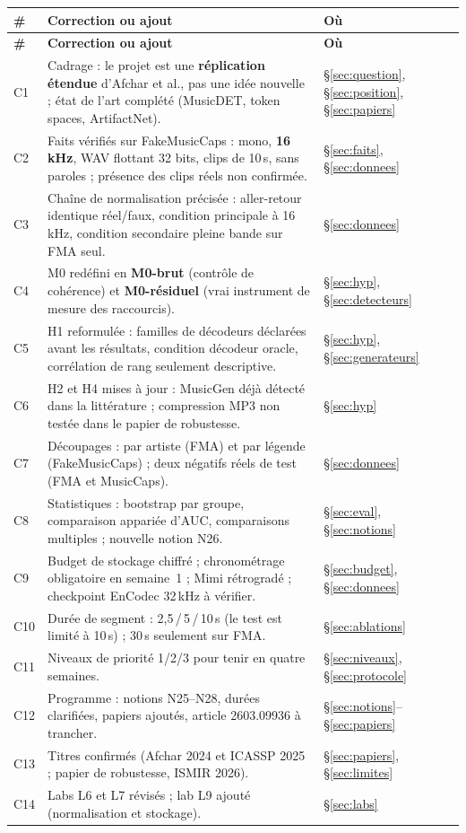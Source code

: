 \documentclass[11pt,a4paper]{article}
\providecommand{\og}{\guillemotleft\nobreakspace}%
\providecommand{\fg}{\nobreakspace\guillemotright}}
\begin{document}
{\small
\begin{longtable}{L{0.9cm}L{11.6cm}L{3.0cm}}
\toprule
\textbf{\#} & \textbf{Correction ou ajout} & \textbf{Où}\\
\midrule
\endfirsthead
\toprule
\textbf{\#} & \textbf{Correction ou ajout} & \textbf{Où}\\
\midrule
\endhead
\bottomrule
\endfoot
C1 & Cadrage : le projet est une \textbf{réplication étendue} d'Afchar et al., pas une idée nouvelle ; état de l'art complété (MusicDET, token spaces, ArtifactNet). & §\ref{sec:question}, §\ref{sec:position}, §\ref{sec:papiers}\\
C2 & Faits vérifiés sur FakeMusicCaps : mono, \textbf{16\,kHz}, WAV flottant 32 bits, clips de 10\,s, sans paroles ; présence des clips réels non confirmée. & §\ref{sec:faits}, §\ref{sec:donnees}\\
C3 & Chaîne de normalisation précisée : aller-retour identique réel/faux, condition principale à 16\,kHz, condition secondaire pleine bande sur FMA seul. & §\ref{sec:donnees}\\
C4 & M0 redéfini en \textbf{M0-brut} (contrôle de cohérence) et \textbf{M0-résiduel} (vrai instrument de mesure des raccourcis). & §\ref{sec:hyp}, §\ref{sec:detecteurs}\\
C5 & H1 reformulée : familles de décodeurs déclarées avant les résultats, condition \og{}décodeur oracle\fg{}, corrélation de rang seulement descriptive. & §\ref{sec:hyp}, §\ref{sec:generateurs}\\
C6 & H2 et H4 mises à jour : MusicGen déjà détecté dans la littérature ; compression MP3 non testée dans le papier de robustesse. & §\ref{sec:hyp}\\
C7 & Découpages : par artiste (FMA) et par légende (FakeMusicCaps) ; deux négatifs réels de test (FMA et MusicCaps). & §\ref{sec:donnees}\\
C8 & Statistiques : bootstrap par groupe, comparaison appariée d'AUC, comparaisons multiples ; nouvelle notion N26. & §\ref{sec:eval}, §\ref{sec:notions}\\
C9 & Budget de stockage chiffré ; chronométrage obligatoire en semaine~1 ; Mimi rétrogradé ; checkpoint EnCodec 32\,kHz à vérifier. & §\ref{sec:budget}, §\ref{sec:donnees}\\
C10 & Durée de segment : 2,5\,/\,5\,/\,10\,s (le test est limité à 10\,s) ; 30\,s seulement sur FMA. & §\ref{sec:ablations}\\
C11 & Niveaux de priorité 1/2/3 pour tenir en quatre semaines. & §\ref{sec:niveaux}, §\ref{sec:protocole}\\
C12 & Programme : notions N25--N28, durées clarifiées, papiers ajoutés, article 2603.09936 à trancher. & §\ref{sec:notions}--§\ref{sec:papiers}\\
C13 & Titres confirmés (Afchar 2024 et ICASSP 2025 ; papier de robustesse, ISMIR 2026). & §\ref{sec:papiers}, §\ref{sec:limites}\\
C14 & Labs L6 et L7 révisés ; lab L9 ajouté (normalisation et stockage). & §\ref{sec:labs}\\
\end{longtable}}
\end{document}
